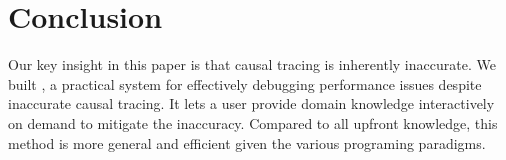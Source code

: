 \section{Conclusion} \label{sec:conclusion}

Our key insight in this paper is that causal tracing is inherently inaccurate.
We built \xxx, a practical system for effectively debugging performance
issues despite inaccurate causal tracing. It lets a user provide domain
knowledge interactively on demand to mitigate the inaccuracy. Compared to all
upfront knowledge, this method is more general and efficient given the various
programing paradigms.

\clearpage
